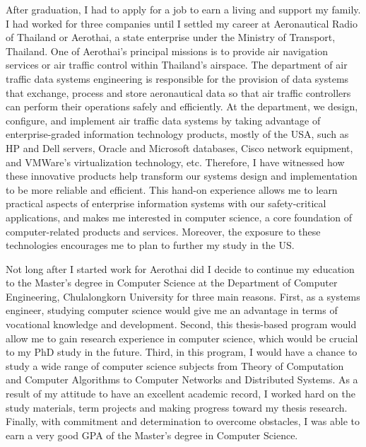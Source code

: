 \documentclass[a4paper,12pt]{report}
\begin{document}
\vspace{0.2cm}
After graduation, I had to apply for a job to earn a living and support my family. I had worked for three companies until I settled my career at Aeronautical Radio of Thailand or Aerothai, a state enterprise under the Ministry of Transport, Thailand. One of Aerothai's principal missions is to provide air navigation services or air traffic control within Thailand's airspace. The department of air traffic data systems engineering is responsible for the provision of data systems that exchange, process and store aeronautical data so that air traffic controllers can perform their operations safely and efficiently. At the department, we design, configure, and implement air traffic data systems by taking advantage of enterprise-graded information technology products, mostly of the USA, such as HP and Dell servers, Oracle and Microsoft databases, Cisco network equipment, and VMWare's virtualization technology, etc. Therefore, I have witnessed how these innovative products help transform our systems design and implementation to be more reliable and efficient. This hand-on experience allows me to learn practical aspects of enterprise information systems with our safety-critical applications, and makes me interested in computer science, a core foundation of computer-related products and services. Moreover, the exposure to these technologies encourages me to plan to further my study in the US.

\vspace{0.2cm}
Not long after I started work for Aerothai did I decide to continue my education to the Master's degree in Computer Science at the Department of Computer Engineering, Chulalongkorn University for three main reasons. First, as a systems engineer, studying computer science would give me an advantage in terms of vocational knowledge and development. Second, this thesis-based program would allow me to gain research experience in computer science, which would be crucial to my PhD study in the future. Third, in this program, I would have a chance to study a wide range of computer science subjects from Theory of Computation and Computer Algorithms to Computer Networks and Distributed Systems. As a result of my attitude to have an excellent academic record, I worked hard on the study materials, term projects and making progress toward my thesis research. 
Finally, with commitment and determination to overcome obstacles, I was able to earn a very good GPA of the Master's degree in Computer Science.
\end{document}
